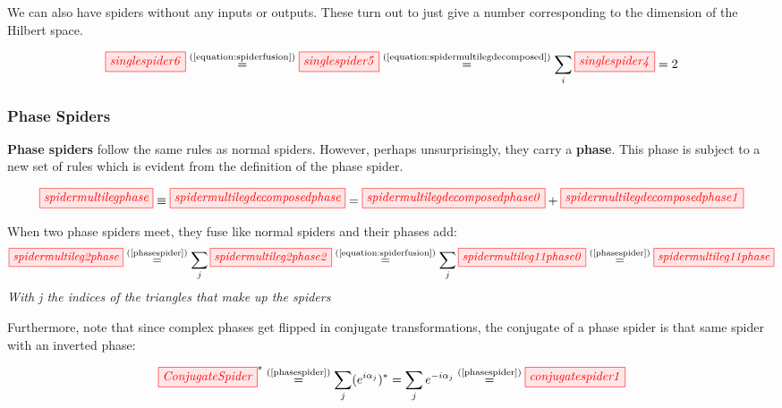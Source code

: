 \documentclass[]{article}
\newcommand{\equaltext}[1]{\ensuremath{\stackrel{\text{#1}}{=}}}
\begin{document}
We can also have spiders without any inputs or outputs. These turn out to just give a number corresponding to the dimension of the Hilbert space.

\begin{equation}
	\label{equation:singlespider}
	\tikzfig{singlespider6} \equaltext{(\ref{equation:spiderfusion})}
	\tikzfig{singlespider5}  \equaltext{(\ref{equation:spidermultilegdecomposed})}
	\sum\limits_i \tikzfig{singlespider4} = 2
\end{equation}



\subsubsection{Phase Spiders}
\label{phasespiders}

\textbf{Phase spiders} follow the same rules as normal spiders. However, perhaps unsurprisingly, they carry a \textbf{phase}. This phase is subject to a new set of rules which is evident from the definition of the phase spider. 

\begin{equation}
\label{phasespider}
\tikzfig{spidermultilegphase} \equiv \tikzfig{spidermultilegdecomposedphase} = \tikzfig{spidermultilegdecomposedphase0} + \tikzfig{spidermultilegdecomposedphase1}
\end{equation}

When two phase spiders meet, they fuse like normal spiders and their phases add:
\begin{equation}
\label{equation:phasespiderfusion}
	\tikzfig{spidermultileg2phase} \equaltext{(\ref{phasespider})} \sum\limits_{j} \tikzfig{spidermultileg2phase2} \equaltext{(\ref{equation:spiderfusion})} \sum\limits_{j} \tikzfig{spidermultileg11phase0} \equaltext{(\ref{phasespider})} \tikzfig{spidermultileg11phase}
\end{equation}
\textit{With j the indices of the triangles that make up the spiders}

Furthermore, note that since complex phases get flipped in conjugate transformations, the conjugate of a phase spider is that same spider with an inverted phase:

\begin{equation}
\label{equation:conjugatespider}
\tikzfig{ConjugateSpider}^* \equaltext{(\ref{phasespider})} \sum\limits_{j}(e^{i\alpha_j})^*= \sum\limits_{j}e^{-i\alpha_j} \equaltext{(\ref{phasespider})} \tikzfig{conjugatespider1}
\end{equation}
\end{document}
